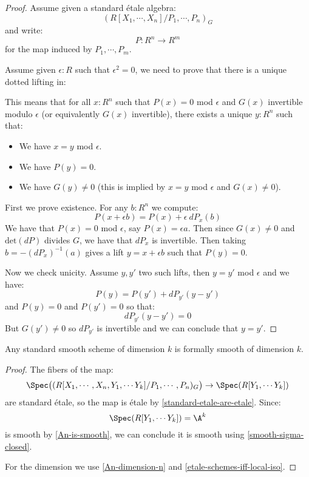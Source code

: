 \begin{proof}
Assume given a standard étale algebra:
\[(R[X_1,\cdots,X_n]/P_1,\cdots,P_n)_G\]
and write:
\[P:R^n\to R^m\]
for the map induced by $P_1,\cdots,P_m$.

Assume given $\epsilon:R$ such that $\epsilon^2=0$, we need to prove that there is a unique dotted lifting in:
  \begin{center}
    \end{center}
This means that for all $x:R^n$ such that $P(x)=0$ mod $\epsilon$ and $G(x)$ invertible modulo $\epsilon$ (or equivalently $G(x)$ invertible), there exists a unique $y:R^n$ such that:
\begin{itemize} 
\item We have $x=y$ mod $\epsilon$.
\item We have $P(y)=0$.
\item We have $G(y)\not=0$ (this is implied by $x=y$ mod $\epsilon$ and $G(x)\not=0$).
\end{itemize}

First we prove existence. For any $b:R^n$ we compute:
\[P(x+\epsilon b) = P(x) + \epsilon\ dP_x(b)\]
We have that $P(x)=0$ mod $\epsilon$, say $P(x) = \epsilon a$. Then since $G(x)\not=0$ and $\mathrm{det}(dP)$ divides $G$, we have that $dP_x$ is invertible. Then taking $b = -(dP_x)^{-1}(a)$ gives a lift $y=x+\epsilon b$ such that $P(y) = 0$.

Now we check unicity. Assume $y,y'$ two such lifts, then $y=y'$ mod $\epsilon$ and we have:
\[P(y) = P(y') + dP_{y'}(y-y')\]
and $P(y)=0$ and $P(y')=0$ so that:
\[dP_{y'}(y-y') = 0\]
But $G(y')\not=0$ so $dP_{y'}$ is invertible and we can conclude that $y=y'$.
\end{proof}

\begin{lemma}\label{standard-smooth-is-smooth}
Any standard smooth scheme of dimension $k$ is formally smooth of dimension $k$.
\end{lemma}

\begin{proof}
The fibers of the map:
\[\Spec\big((R[X_1,\cdots,X_n,Y_1,\cdots Y_{k}] / P_1,\cdots,P_n)_G\big) \to \Spec(R[Y_1,\cdots Y_{k}])\]
are standard étale, so the map is étale by \cref{standard-etale-are-etale}. Since:
\[\Spec(R[Y_1,\cdots Y_{k}]) = \A^k\]
is smooth by \cref{An-is-smooth}, we can conclude it is smooth using \cref{smooth-sigma-closed}. 

For the dimension we use \cref{An-dimension-n} and \cref{etale-schemes-iff-local-iso}.
\end{proof}



